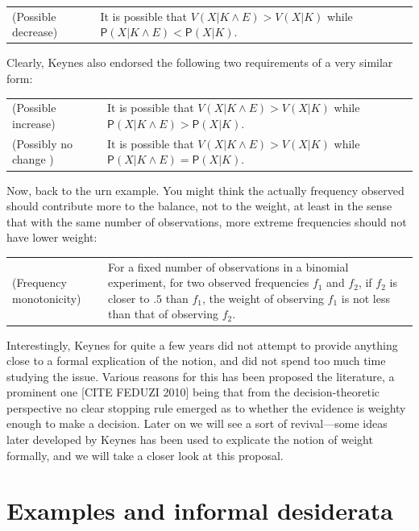 \documentclass[
  10pt,
  dvipsnames,enabledeprecatedfontcommands]{scrartcl}
\newcommand{\pr}[1]{\mathsf{P}(#1)}
\begin{document}
\begin{tabular}{lp{11cm}}
(Possible decrease) & It is possible that   $V(X\vert K \wedge E) > V(X\vert K)$ while $\pr{X \vert K \wedge E} <  \pr {X\vert K}$.
\end{tabular}

Clearly, Keynes also endorsed the following two requirements of a very
similar form:

\begin{tabular}{lp{11cm}}
(Possible increase) & It is possible that   $V(X\vert K \wedge E) > V(X\vert K)$ while $\pr{X \vert K \wedge E} >  \pr {X\vert K}$. \\
(Possibly no change ) & It is possible that   $V(X\vert K \wedge E) > V(X\vert K)$ while $\pr{X \vert K \wedge E} =  \pr {X\vert K}$.
\end{tabular}

Now, back to the urn example. You might think the actually frequency
observed should contribute more to the balance, not to the weight, at
least in the sense that with the same number of observations, more
extreme frequencies should not have lower weight:

\begin{tabular}{lp{11cm}}
(Frequency monotonicity) & For a fixed number of observations in a binomial experiment, for two observed frequencies $f_1$ and $f_2$, if $f_2$ is closer to $.5$ than $f_1$, the weight of observing $f_1$ is not less than that of observing $f_2$.
\end{tabular}

Interestingly, Keynes for quite a few years did not attempt to provide
anything close to a formal explication of the notion, and did not spend
too much time studying the issue. Various reasons for this has been
proposed the literature, a prominent one {[}CITE FEDUZI 2010{]} being
that from the decision-theoretic perspective no clear stopping rule
emerged as to whether the evidence is weighty enough to make a decision.
Later on we will see a sort of revival---some ideas later developed by
Keynes has been used to explicate the notion of weight formally, and we
will take a closer look at this proposal. 

\hypertarget{examples-and-informal-desiderata}{%
\section{Examples and informal
desiderata}\label{examples-and-informal-desiderata}}
\end{document}
